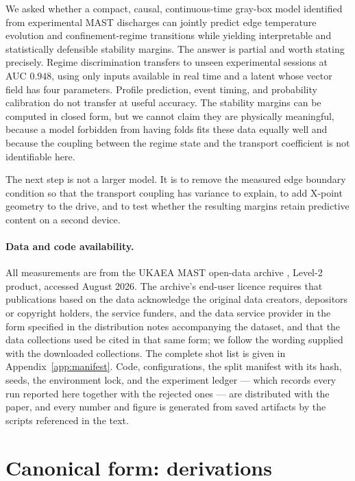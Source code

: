 \documentclass[11pt]{article}
\begin{document}
We asked whether a compact, causal, continuous-time gray-box model
identified from experimental MAST discharges can jointly predict edge
temperature evolution and confinement-regime transitions while yielding
interpretable and statistically defensible stability margins. The answer is
partial and worth stating precisely. Regime discrimination transfers to
unseen experimental sessions at AUC $0.948$, using only inputs available in
real time and a latent whose vector field has four parameters. Profile
prediction, event timing, and probability calibration do not transfer at
useful accuracy. The stability margins can be computed in closed form, but
we cannot claim they are physically meaningful, because a model forbidden
from having folds fits these data equally well and because the coupling
between the regime state and the transport coefficient is not identifiable
here.

The next step is not a larger model. It is to remove the measured edge
boundary condition so that the transport coupling has variance to explain,
to add X-point geometry to the drive, and to test whether the resulting
margins retain predictive content on a second device.

\paragraph{Data and code availability.} All measurements are from the UKAEA
MAST open-data archive \citep{mastopendata}, Level-2 product, accessed
August 2026. The archive's end-user licence requires that publications based
on the data acknowledge the original data creators, depositors or copyright
holders, the service funders, and the data service provider in the form
specified in the distribution notes accompanying the dataset, and that the
data collections used be cited in that same form; we follow the wording
supplied with the downloaded collections. The complete shot list is given in
Appendix~\ref{app:manifest}. Code, configurations, the split manifest with
its hash, seeds, the environment lock, and the experiment ledger --- which
records every run reported here together with the rejected ones --- are
distributed with the paper, and every number and figure is generated from
saved artifacts by the scripts referenced in the text.




\appendix

\section{Canonical form: derivations}
\label{app:canonical}
\end{document}
